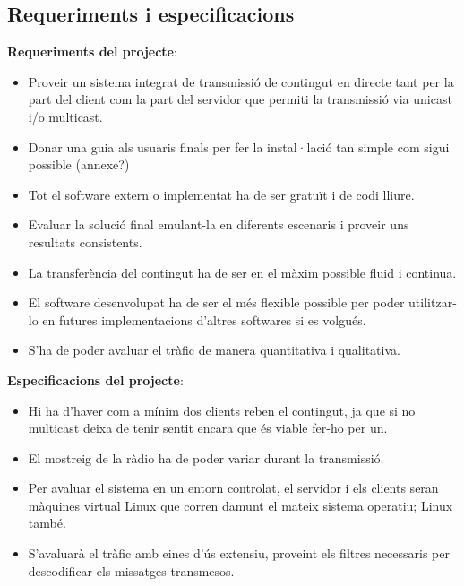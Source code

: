 \subsection{Requeriments i especificacions}
{
    \textbf{Requeriments del projecte}:
    \begin{itemize}
        \item Proveir un sistema integrat de transmissió de contingut en directe tant per la part del client
        com la part del servidor que permiti la transmissió via unicast i/o multicast.
        \item Donar una guia als usuaris finals per fer la instal·lació tan simple com sigui possible (annexe?)
        \item Tot el software extern o implementat ha de ser gratuït i de codi lliure.
        \item Evaluar la solució final emulant-la en diferents escenaris i proveir uns resultats consistents.
        \item La transferència del contingut ha de ser en el màxim possible fluid i continua.
        \item El software desenvolupat ha de ser el més flexible possible per poder utilitzar-lo en futures
        implementacions d'altres softwares si es volgués.
        \item S'ha de poder avaluar el tràfic de manera quantitativa i qualitativa.
    \end{itemize}
    
    \textbf{Especificacions del projecte}:
    \begin{itemize}
        \item Hi ha d'haver com a mínim dos clients reben el contingut, ja que si no multicast deixa de tenir sentit encara
        que és viable fer-ho per un.
        \item El mostreig de la ràdio ha de poder variar durant la transmissió.
        \item Per avaluar el sistema en un entorn controlat, el servidor i els clients seran màquines virtual Linux que corren
        damunt el mateix sistema operatiu; Linux també.
        \item S'avaluarà el tràfic amb eines d'ús extensiu, proveint els filtres necessaris per descodificar els missatges transmesos.
    \end{itemize}
}

